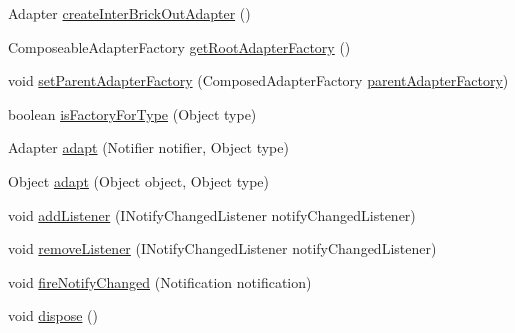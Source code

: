 \begin{DoxyCompactItemize}
\item 
Adapter \hyperlink{classshootingmachineemfmodel_1_1provider_1_1_shootingmachineemfmodel_item_provider_adapter_factory_a41956f1ac6f14de4089c57afd5571132}{create\-Inter\-Brick\-Out\-Adapter} ()
\item 
Composeable\-Adapter\-Factory \hyperlink{classshootingmachineemfmodel_1_1provider_1_1_shootingmachineemfmodel_item_provider_adapter_factory_a7e0449c23e459ebbd6dd50da7d0c9085}{get\-Root\-Adapter\-Factory} ()
\item 
void \hyperlink{classshootingmachineemfmodel_1_1provider_1_1_shootingmachineemfmodel_item_provider_adapter_factory_a60be5764e7b820fae44a614f838d117b}{set\-Parent\-Adapter\-Factory} (Composed\-Adapter\-Factory \hyperlink{classshootingmachineemfmodel_1_1provider_1_1_shootingmachineemfmodel_item_provider_adapter_factory_aefa932b17c6961fbfbead5540d214176}{parent\-Adapter\-Factory})
\item 
boolean \hyperlink{classshootingmachineemfmodel_1_1provider_1_1_shootingmachineemfmodel_item_provider_adapter_factory_ac02041f3111130056d7d0dd20648bb12}{is\-Factory\-For\-Type} (Object type)
\item 
Adapter \hyperlink{classshootingmachineemfmodel_1_1provider_1_1_shootingmachineemfmodel_item_provider_adapter_factory_a2cb88ef6962b8366097d9fe691790dde}{adapt} (Notifier notifier, Object type)
\item 
Object \hyperlink{classshootingmachineemfmodel_1_1provider_1_1_shootingmachineemfmodel_item_provider_adapter_factory_a60ee81b80f4bc8d5083903e43f3b54d4}{adapt} (Object object, Object type)
\item 
void \hyperlink{classshootingmachineemfmodel_1_1provider_1_1_shootingmachineemfmodel_item_provider_adapter_factory_a19767a479130e0ba45c73b4868f96402}{add\-Listener} (I\-Notify\-Changed\-Listener notify\-Changed\-Listener)
\item 
void \hyperlink{classshootingmachineemfmodel_1_1provider_1_1_shootingmachineemfmodel_item_provider_adapter_factory_ab31c34e824c8486c3830d0ae32f6261b}{remove\-Listener} (I\-Notify\-Changed\-Listener notify\-Changed\-Listener)
\item 
void \hyperlink{classshootingmachineemfmodel_1_1provider_1_1_shootingmachineemfmodel_item_provider_adapter_factory_a804ba049fd79f648d54aad9033c9eecd}{fire\-Notify\-Changed} (Notification notification)
\item 
void \hyperlink{classshootingmachineemfmodel_1_1provider_1_1_shootingmachineemfmodel_item_provider_adapter_factory_a06b61872a84d6ead2957a8fb3ab61c01}{dispose} ()
\end{DoxyCompactItemize}
